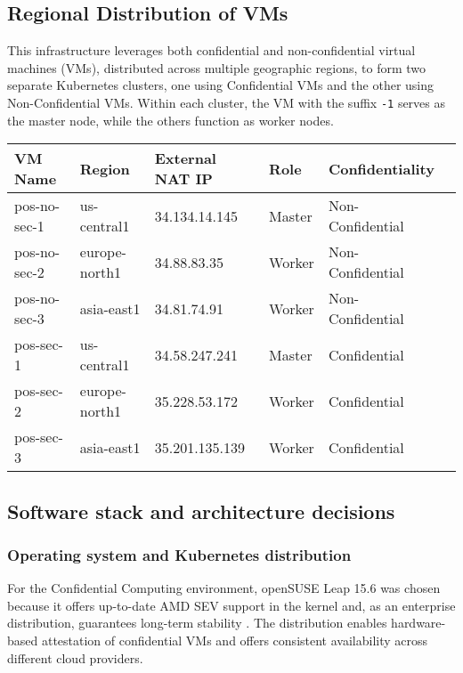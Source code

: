 \subsection{Regional Distribution of VMs}

This infrastructure leverages both confidential and non-confidential virtual machines (VMs), distributed across multiple geographic regions, to form two separate Kubernetes clusters, one using Confidential VMs and the other using Non-Confidential VMs. Within each cluster, the VM with the suffix \texttt{-1} serves as the master node, while the others function as worker nodes.

\begin{longtable}{@{}llllll@{}}
\toprule
\textbf{VM Name} & \textbf{Region} & \textbf{External NAT IP} & \textbf{Role} & \textbf{Confidentiality} \\
\midrule
pos-no-sec-1 & us-central1    & 34.134.14.145    & Master & Non-Confidential \\
pos-no-sec-2 & europe-north1  & 34.88.83.35      & Worker & Non-Confidential \\
pos-no-sec-3 & asia-east1     & 34.81.74.91      & Worker & Non-Confidential \\
pos-sec-1    & us-central1    & 34.58.247.241    & Master & Confidential \\
pos-sec-2    & europe-north1  & 35.228.53.172    & Worker & Confidential \\
pos-sec-3    & asia-east1     & 35.201.135.139   & Worker & Confidential \\
\bottomrule
\end{longtable}

\subsection{Software stack and architecture decisions}

\subsubsection{Operating system and Kubernetes distribution}

For the Confidential Computing environment, openSUSE Leap 15.6 was chosen because it offers up-to-date AMD SEV support in the kernel and, as an enterprise distribution, guarantees long-term stability \parencite{amd_sev_2024}. The distribution enables hardware-based attestation of confidential VMs and offers consistent availability across different cloud providers.

